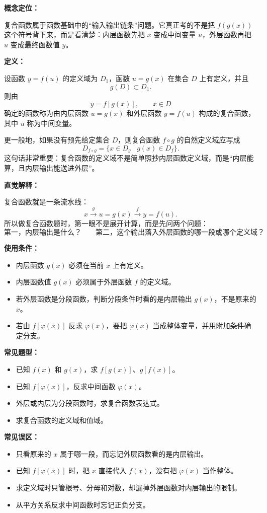 \begin{knowledgeBox}
\textbf{概念定位：}

复合函数属于函数基础中的“输入输出链条”问题。它真正考的不是把 \(f(g(x))\) 这个符号背下来，而是看清楚：内层函数先把 \(x\) 变成中间变量 \(u\)，外层函数再把 \(u\) 变成最终函数值 \(y\)。

\textbf{定义：}

设函数 \(y=f(u)\) 的定义域为 \(D_1\)，函数 \(u=g(x)\) 在集合 \(D\) 上有定义，并且
\[
g(D)\subset D_1.
\]
则由
\[
y=f[g(x)],\qquad x\in D
\]
确定的函数称为由内层函数 \(u=g(x)\) 和外层函数 \(y=f(u)\) 构成的复合函数，其中 \(u\) 称为中间变量。

更一般地，如果没有预先给定集合 \(D\)，则复合函数 \(f\circ g\) 的自然定义域应写成
\[
D_{f\circ g}=\{x\in D_g\mid g(x)\in D_f\}.
\]
这句话非常重要：复合函数的定义域不是简单照抄内层函数定义域，而是“内层能算，且内层输出能送进外层”。

\textbf{直觉解释：}

复合函数就是一条流水线：
\[
x \xrightarrow{g} u=g(x) \xrightarrow{f} y=f(u).
\]
所以做复合函数题时，第一眼不是展开计算，而是先问两个问题：
\[
\text{第一，内层输出是什么？}
\qquad
\text{第二，这个输出落入外层函数的哪一段或哪个定义域？}
\]

\textbf{使用条件：}

\begin{itemize}
  \item 内层函数 \(g(x)\) 必须在当前 \(x\) 上有定义。
  \item 内层函数值 \(g(x)\) 必须属于外层函数 \(f\) 的定义域。
  \item 若外层函数是分段函数，判断分段条件时看的是内层输出 \(g(x)\)，不是原来的 \(x\)。
  \item 若由 \(f[\varphi(x)]\) 反求 \(\varphi(x)\)，要把 \(\varphi(x)\) 当成整体变量，并用附加条件确定分支。
\end{itemize}

\textbf{常见题型：}

\begin{itemize}
  \item 已知 \(f(x)\) 和 \(g(x)\)，求 \(f[g(x)]\)、\(g[f(x)]\)。
  \item 已知 \(f[\varphi(x)]\)，反求中间函数 \(\varphi(x)\)。
  \item 外层或内层为分段函数时，求复合函数表达式。
  \item 求复合函数的定义域和值域。
\end{itemize}

\textbf{常见误区：}

\begin{itemize}
  \item 只看原来的 \(x\) 属于哪一段，而忘记外层函数看的是内层输出。
  \item 已知 \(f[\varphi(x)]\) 时，把 \(x\) 直接代入 \(f(x)\)，没有把 \(\varphi(x)\) 当作整体。
  \item 求定义域时只管根号、分母和对数，却漏掉外层函数对内层输出的限制。
  \item 从平方关系反求中间函数时忘记正负分支。
\end{itemize}
\end{knowledgeBox}

